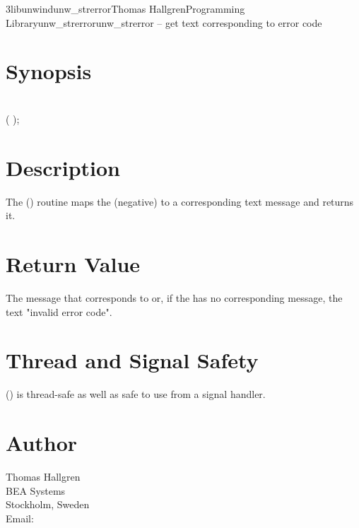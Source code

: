 \documentclass{article}
\begin{document}
\begin{Name}{3libunwind}{unw\_strerror}{Thomas Hallgren}{Programming Library}{unw\_strerror}unw\_strerror -- get text corresponding to error code
\end{Name}

\section{Synopsis}

\\

 ( );\\

\section{Description}

The () routine maps the (negative) 
to a corresponding text message and returns it.

\section{Return Value}

The message that corresponds to  or, if the
 has no corresponding message, the text "invalid error
code".

\section{Thread and Signal Safety}

() is thread-safe as well as safe to use
from a signal handler.

\section{Author}

\noindent
Thomas Hallgren\\
BEA Systems\\
Stockholm, Sweden\\
Email: \\
\LatexManEnd
\end{document}
